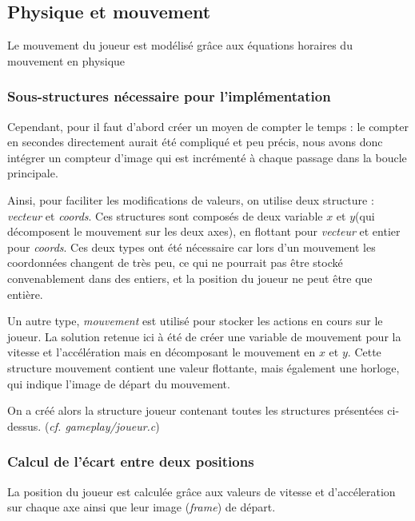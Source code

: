 \documentclass[12pt]{article}
\begin{document}
		\newpage
		
	
		\subsection{Physique et mouvement}
		
		Le mouvement du joueur est modélisé grâce aux équations horaires du mouvement en physique
		
		\subsubsection{Sous-structures nécessaire pour l'implémentation}
		
		Cependant, pour il faut d'abord créer un moyen de compter le temps : le compter en secondes directement aurait été compliqué et peu précis, nous avons donc intégrer un compteur d'image qui est incrémenté à chaque passage dans la boucle principale.
		
		\medskip
		
		Ainsi, pour faciliter les modifications de valeurs, on utilise deux structure : \textit{vecteur} et \textit{coords}.
		Ces structures sont composés de deux variable \(x\) et \(y\)(qui décomposent le mouvement sur les deux axes), en flottant pour \textit{vecteur} et entier pour \textit{coords}. Ces deux types ont été nécessaire car lors d'un mouvement les coordonnées changent de très peu, ce qui ne pourrait pas être stocké convenablement dans des entiers, et la position du joueur ne peut être que entière.  
		
		Un autre type, \textit{mouvement} est utilisé pour stocker les actions en cours sur le joueur. La solution retenue ici à été de créer une variable de mouvement pour la vitesse et l'accélération mais en décomposant le mouvement en \(x\) et \(y\). Cette structure mouvement contient une valeur flottante, mais également une horloge, qui indique l'image de départ du mouvement.
		 
		\medskip
		On a créé alors la structure joueur contenant toutes les structures présentées ci-dessus. (\textit{cf. gameplay/joueur.c})
		
		\subsubsection{Calcul de l'écart entre deux positions}
		
		La position du joueur est calculée grâce aux valeurs de vitesse et d'accéleration sur chaque axe ainsi que leur image (\textit{frame}) de départ.
		
\end{document}
